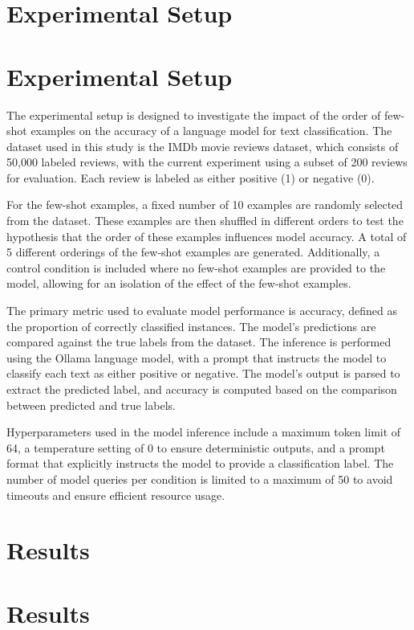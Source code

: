 \documentclass{article}
\begin{document}
\section{Experimental Setup}
\section{Experimental Setup}

The experimental setup is designed to investigate the impact of the order of few-shot examples on the accuracy of a language model for text classification. The dataset used in this study is the IMDb movie reviews dataset, which consists of 50,000 labeled reviews, with the current experiment using a subset of 200 reviews for evaluation. Each review is labeled as either positive (1) or negative (0). 

For the few-shot examples, a fixed number of 10 examples are randomly selected from the dataset. These examples are then shuffled in different orders to test the hypothesis that the order of these examples influences model accuracy. A total of 5 different orderings of the few-shot examples are generated. Additionally, a control condition is included where no few-shot examples are provided to the model, allowing for an isolation of the effect of the few-shot examples.

The primary metric used to evaluate model performance is accuracy, defined as the proportion of correctly classified instances. The model's predictions are compared against the true labels from the dataset. The inference is performed using the Ollama language model, with a prompt that instructs the model to classify each text as either positive or negative. The model's output is parsed to extract the predicted label, and accuracy is computed based on the comparison between predicted and true labels.

Hyperparameters used in the model inference include a maximum token limit of 64, a temperature setting of 0 to ensure deterministic outputs, and a prompt format that explicitly instructs the model to provide a classification label. The number of model queries per condition is limited to a maximum of 50 to avoid timeouts and ensure efficient resource usage.
\section{Results}
\section{Results}
\end{document}
